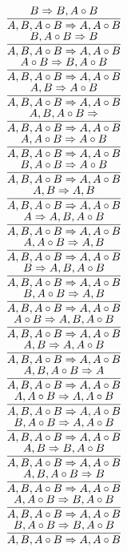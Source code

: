 \documentclass[11pt]{article}
\begin{document}
\begin{center}
\bigskip
\\$\infer{A, B, A\circ B\Rightarrow A, A\circ B}{B\Rightarrow B, A\circ B}$
\bigskip
\\$\infer{A, B, A\circ B\Rightarrow A, A\circ B}{B, A\circ B\Rightarrow B}$
\bigskip
\\$\infer{A, B, A\circ B\Rightarrow A, A\circ B}{A\circ B\Rightarrow B, A\circ B}$
\bigskip
\\$\infer{A, B, A\circ B\Rightarrow A, A\circ B}{A, B\Rightarrow A\circ B}$
\bigskip
\\$\infer{A, B, A\circ B\Rightarrow A, A\circ B}{A, B, A\circ B\Rightarrow }$
\bigskip
\\$\infer{A, B, A\circ B\Rightarrow A, A\circ B}{A, A\circ B\Rightarrow A\circ B}$
\bigskip
\\$\infer{A, B, A\circ B\Rightarrow A, A\circ B}{B, A\circ B\Rightarrow A\circ B}$
\bigskip
\\$\infer{A, B, A\circ B\Rightarrow A, A\circ B}{A, B\Rightarrow A, B}$
\bigskip
\\$\infer{A, B, A\circ B\Rightarrow A, A\circ B}{A\Rightarrow A, B, A\circ B}$
\bigskip
\\$\infer{A, B, A\circ B\Rightarrow A, A\circ B}{A, A\circ B\Rightarrow A, B}$
\bigskip
\\$\infer{A, B, A\circ B\Rightarrow A, A\circ B}{B\Rightarrow A, B, A\circ B}$
\bigskip
\\$\infer{A, B, A\circ B\Rightarrow A, A\circ B}{B, A\circ B\Rightarrow A, B}$
\bigskip
\\$\infer{A, B, A\circ B\Rightarrow A, A\circ B}{A\circ B\Rightarrow A, B, A\circ B}$
\bigskip
\\$\infer{A, B, A\circ B\Rightarrow A, A\circ B}{A, B\Rightarrow A, A\circ B}$
\bigskip
\\$\infer{A, B, A\circ B\Rightarrow A, A\circ B}{A, B, A\circ B\Rightarrow A}$
\bigskip
\\$\infer{A, B, A\circ B\Rightarrow A, A\circ B}{A, A\circ B\Rightarrow A, A\circ B}$
\bigskip
\\$\infer{A, B, A\circ B\Rightarrow A, A\circ B}{B, A\circ B\Rightarrow A, A\circ B}$
\bigskip
\\$\infer{A, B, A\circ B\Rightarrow A, A\circ B}{A, B\Rightarrow B, A\circ B}$
\bigskip
\\$\infer{A, B, A\circ B\Rightarrow A, A\circ B}{A, B, A\circ B\Rightarrow B}$
\bigskip
\\$\infer{A, B, A\circ B\Rightarrow A, A\circ B}{A, A\circ B\Rightarrow B, A\circ B}$
\bigskip
\\$\infer{A, B, A\circ B\Rightarrow A, A\circ B}{B, A\circ B\Rightarrow B, A\circ B}$

\end{center}
\end{document}
